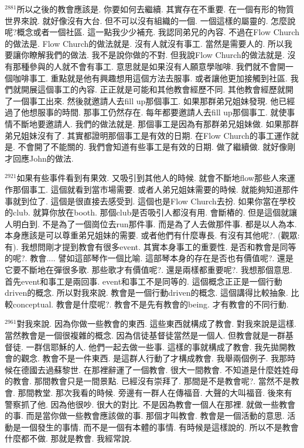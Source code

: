 \documentclass{book}
\begin{document}
$^{2881}$所以之後的教會應該是.
你要如何去繼續.
其實存在不重要.
在一個有形的物質世界來說.
就好像沒有大台.
但不可以沒有組織的一個.
一個這樣的屬靈的.
怎麼說呢?概念或者一個社區.
這一點我少少補充.
我認同弟兄的內容.
不過在Flow Church的做法是.
Flow Church的做法就是.
沒有人就沒有事工.
當然是需要人的.
所以我要讓你瞭解我們的做法.
我不是說你做的不對.
但我說Flow Church的做法就是.
沒有那種參與的人就不會有事工.
意思就是如果沒有人願意學咖啡.
我們就不會開一個咖啡事工.
重點就是他有興趣想用這個方法去服事.
或者讓他更加接觸到社區.
我們就開展這個事工的內容.
正正就是可能和其他教會經歷不同.
其他教會經歷就開了一個事工出來.
然後就邀請人去fill up那個事工.
如果那群弟兄姐妹發現.
他已經過了他想服事的時間.
那事工仍然存在.
每年都要邀請人去fill up那個事工.
就使事情不斷地要邀請人.
我們的做法就是.
那個事工是因為有那群弟兄姐妹做.
如果那群弟兄姐妹沒有了.
其實都證明那個事工是有效的日期.
在Flow Church的事工運作就是.
不會開了不能關的.
我們會知道有些事工是有效的日期.
做了繼續做.
就好像剛才回應John的做法.

$^{2921}$如果有些事件看到有果效.
又吸引到其他人的時候.
就會不斷地flow那些人來運作那個事工.
這個就看到當市場需要.
或者人弟兄姐妹需要的時候.
就能夠知道那件事就到位了.
這個是很直接去感受到.
這個也是Flow Church去扮.
如果你當在學校的club.
就算你放在booth.
那個club是否吸引人都沒有用.
會斷樁的.
但是這個就讓人明白到.
不是為了一個崗位去run那件事.
而是為了人去做那件事.
都是以人為本.
本身應該是可以尊重弟兄姐妹的需要.
或者他們有什麼專長.
有沒有其他呢?.
(觀眾:有).
我想問剛才提到教會有很多event.
其實本身事工的重要性.
是否和教會是同等的呢?.
教會....
譬如這部琴作一個比喻.
這部琴本身的存在是否也有價值呢?.
還是它要不斷地在彈很多歌.
那些歌才有價值呢?.
還是兩樣都重要呢?.
我想那個意思.
首先event和事工是兩回事.
event和事工不是同等的.
這個概念正正是一個行動driven的概念.
所以對我來說.
教會是一個行動driven的概念.
這個講得比較抽象.
比較conceptual.
教會是什麼呢?.
教會不是先有教會的being.
才有教會的不同行動.

$^{2961}$對我來說.
因為你做一些教會的東西.
這些東西就構成了教會.
對我來說是這樣.
當然教會是一個很複雜的概念.
因為信徒基督徒當然是一個人.
但教會就是一群基督徒.
一群信耶穌的人.
他們一起去做一些事.
這樣的事就構成了教會.
我先拋開教會的觀念.
教會不是一件東西.
是這群人行動了才構成教會.
我舉兩個例子.
我那時候在德國去過蘇黎世.
在那裡辭運了一個教會.
很大一間教會.
不知道是什麼姓姓母的教會.
那間教會只是一間景點.
已經沒有崇拜了.
那間是不是教會呢?.
當然不是教會.
那間教堂.
那次我看的時候.
旁邊有一群人在傳福音.
大聲的大叫福音.
後來有警察抓了他.
因為他很吵.
很大的對比.
不是因為教會一個人在那裡.
就做一些教會的事.
而是當你做一些教會應該做的事.
那個才叫教會.
教會是一個活動的意思.
活動是一個發生的事情.
而不是一個有本體的事情.
有時候是這樣說的.
所以不是教會什麼都不做.
那就是教會.
我經常說.
\end{document}
